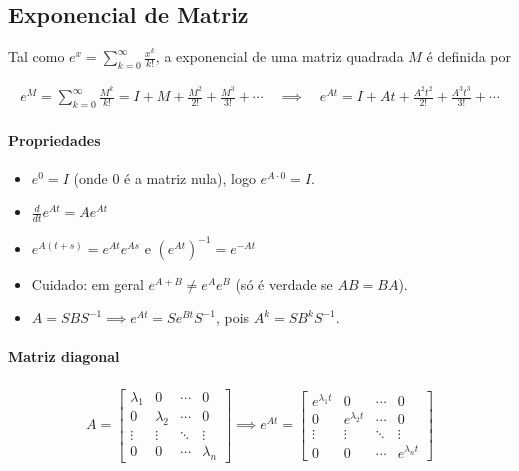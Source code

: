 \documentclass{article}
\begin{document}
\bigskip

\subsection{Exponencial de Matriz}
\label{subsec: exponencial-matriz}

Tal como $e^x = \sum_{k=0}^{\infty} \frac{x^k}{k!}$, a exponencial de uma matriz quadrada $M$ é definida por

\begin{gather*}
\boxed{e^{M} = \sum_{k=0}^{\infty} \frac{M^k}{k!} = I + M + \frac{M^2}{2!} + \frac{M^3}{3!} + \cdots}
\quad \implies \quad
e^{At} = I + At + \frac{A^2 t^2}{2!} + \frac{A^3 t^3}{3!} + \cdots
\end{gather*}

\paragraph{Propriedades}

\begin{itemize}
    \item $e^{0} = I$ (onde $0$ é a matriz nula), logo $e^{A \cdot 0} = I$.
    \item $\frac{d}{dt} e^{At} = A e^{At}$
    \item $e^{A(t + s)} = e^{At} e^{As}$ e $\left( e^{At} \right)^{-1} = e^{-At}$
    \item Cuidado: em geral $e^{A + B} \neq e^{A} e^{B}$ (só é verdade se $AB = BA$).
    \item $A = S B S^{-1} \implies e^{At} = S e^{Bt} S^{-1}$, pois $A^k = S B^k S^{-1}$.
\end{itemize}

\paragraph{Matriz diagonal}

\begin{gather*}
A =
\begin{bmatrix}
\lambda_1 & 0 & \cdots & 0 \\
0 & \lambda_2 & \cdots & 0 \\
\vdots & \vdots & \ddots & \vdots \\
0 & 0 & \cdots & \lambda_n
\end{bmatrix}
\implies
e^{At} =
\begin{bmatrix}
e^{\lambda_1 t} & 0 & \cdots & 0 \\
0 & e^{\lambda_2 t} & \cdots & 0 \\
\vdots & \vdots & \ddots & \vdots \\
0 & 0 & \cdots & e^{\lambda_n t}
\end{bmatrix}
\end{gather*}
\end{document}
